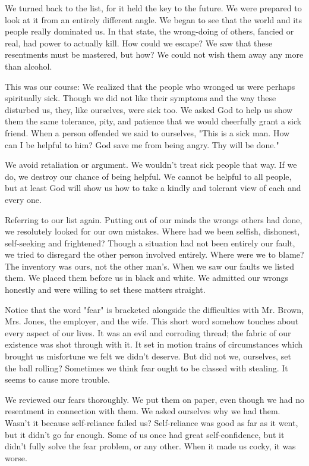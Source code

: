 \begin{biblechapter}
\verse We turned back to the list, 
    for it held the key to the future.
\verse We were prepared to look at it from an entirely different angle.
\verse We began to see that the world and its people really dominated us.
\verse In that state, 
    the wrong-doing of others, 
    fancied or real, 
    had power to actually kill.
\verse How could we escape?
\verse We saw that these resentments must be mastered, but how?
\verse We could not wish them away any more than alcohol.

This was our course:  We realized that the people who wronged us were perhaps spiritually sick. Though we did not like their symptoms and the way these disturbed us, they, like ourselves, were sick too.  We asked God to help us show them the same tolerance, pity, and patience that we would cheerfully grant a sick friend.  When a person offended we said to ourselves, "This is a sick man.  How can I be helpful to him?  God save me from being angry.  Thy will be done."

We avoid retaliation or argument.  We wouldn't treat sick people that way.  If we do, we destroy our chance of being helpful.  We cannot be helpful to all people, but at least God will show us how to take a kindly and tolerant view of each and every one.

Referring to our list again.  Putting out of our minds the wrongs others had done, we resolutely looked for our own mistakes.  Where had we been selfish, dishonest, self-seeking and frightened?  Though a situation had not been entirely our fault, we tried to disregard the other person involved entirely.  Where were we to blame?  The inventory was ours, not the other man's.  When we saw our faults we listed them.  We placed them before us in black and white.  We admitted our wrongs honestly and were willing to set these matters straight.

Notice that the word "fear" is bracketed alongside the difficulties with Mr. Brown, Mrs. Jones, the employer, and the wife.  This short word somehow touches about every aspect of our lives.  It was an evil and corroding thread; the fabric of our existence was shot through with it.  It set in motion trains of circumstances which brought us misfortune we felt we didn't deserve.  But did not we, ourselves, set the ball rolling?  Sometimes we think fear ought to be classed with stealing.  It seems to cause more trouble.

We reviewed our fears thoroughly.  We put them on paper, even though we had no resentment in connection with them.  We asked ourselves why we had them.  Wasn't it because self-reliance failed us?  Self-reliance was good as far as it went, but it didn't go far enough.  Some of us once had great self-confidence, but it didn't fully solve the fear problem, or any other.  When it made us cocky, it was worse.


\end{biblechapter}
